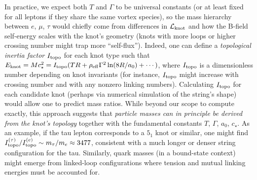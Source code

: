 \documentclass[12pt]{article}
\begin{document}
In practice, we expect both $T$ and $\Gamma$ to be universal constants (or at least fixed for all leptons if they share the same vortex species), so the mass hierarchy between $e$, $\mu$, $\tau$ would chiefly come from differences in $\mathcal{L}_{\rm knot}$ and how the B-field self-energy scales with the knot’s geometry (knots with more loops or higher crossing number might trap more “self-flux”). Indeed, one can define a \emph{topological inertia factor} $I_{\rm topo}$ for each knot type such that $E_{\rm knot} = M c_{\star}^2 = I_{\rm topo} (T R + \rho_{\rm eff}\Gamma^2 \ln(8R/a_0) + \cdots)$, where $I_{\rm topo}$ is a dimensionless number depending on knot invariants (for instance, $I_{\rm topo}$ might increase with crossing number and with any nonzero linking numbers). Calculating $I_{\rm topo}$ for each candidate knot (perhaps via numerical simulation of the string’s shape) would allow one to predict mass ratios. While beyond our scope to compute exactly, this approach suggests that \emph{particle masses can in principle be derived from the knot’s topology} together with the fundamental constants $T$, $\Gamma$, $a_0$, $c_{\star}$. As an example, if the tau lepton corresponds to a $5_1$ knot or similar, one might find $I_{\rm topo}^{(\tau)} / I_{\rm topo}^{(e)} \sim m_{\tau}/m_{e} \approx 3477$, consistent with a much longer or denser string configuration for the tau. Similarly, quark masses (in a bound-state context) might emerge from linked-loop configurations where tension and mutual linking energies must be accounted for.
\end{document}
